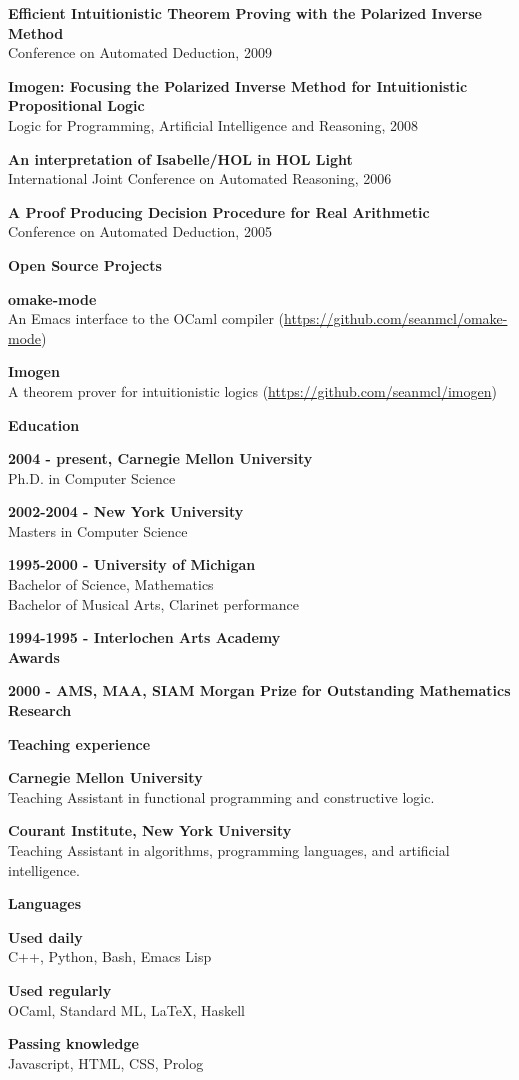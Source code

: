 \documentclass[a4paper,12pt,final]{memoir}
\newcommand{\SmallSep}{\vspace{0.5em}}
\newcommand{\CVSection}[1]
{\Large\textbf{#1}\par
  \SmallSep\normalsize\normalfont}
\newcommand{\CVItem}[1]
{\textbf{\color{RoyalBlue} #1}}
\newcommand{\CPP}{C\hspace{-2pt}+\hspace{-4pt}+}
\begin{document}
\CVItem{Efficient Intuitionistic Theorem Proving with the Polarized Inverse Method}\\
Conference on Automated Deduction, 2009
\SmallSep

\CVItem{Imogen: Focusing the Polarized Inverse Method for Intuitionistic Propositional Logic}\\
Logic for Programming, Artificial Intelligence and Reasoning, 2008
\SmallSep

\CVItem{An interpretation of Isabelle/HOL in HOL Light}\\
International Joint Conference on Automated Reasoning, 2006
\SmallSep

\CVItem{A Proof Producing Decision Procedure for Real Arithmetic}\\
Conference on Automated Deduction, 2005
\SmallSep

\CVSection{Open Source Projects}
\CVItem{omake-mode}\\
An Emacs interface to the OCaml compiler (\url{https://github.com/seanmcl/omake-mode})
\SmallSep

\CVItem{Imogen}\\
A theorem prover for intuitionistic logics (\url{https://github.com/seanmcl/imogen})
\SmallSep

\CVSection{Education}
\CVItem{2004 - present, Carnegie Mellon University}\\
Ph.D. in Computer Science
\SmallSep

\CVItem{2002-2004 - New York University}\\
Masters in Computer Science
\SmallSep

\CVItem{1995-2000 - University of Michigan}\\
Bachelor of Science, Mathematics \\
Bachelor of Musical Arts, Clarinet performance \\
\SmallSep

\CVItem{1994-1995 - Interlochen Arts Academy}\\

\CVSection{Awards}
\CVItem{2000 - AMS, MAA, SIAM Morgan Prize for Outstanding Mathematics Research}
\SmallSep

\CVSection{Teaching experience}

\CVItem{Carnegie Mellon University}\\
Teaching Assistant in functional programming and constructive logic.
\SmallSep

\CVItem{Courant Institute, New York University}\\
Teaching Assistant in algorithms, programming languages, and
artificial intelligence.
\SmallSep

\CVSection{Languages}

\CVItem{Used daily}\\
 \CPP, Python, Bash, Emacs Lisp
\SmallSep

\CVItem{Used regularly}\\
OCaml, Standard ML, \LaTeX, Haskell
\SmallSep

\CVItem{Passing knowledge}\\
Javascript, HTML, CSS, Prolog
\SmallSep
\end{document}
